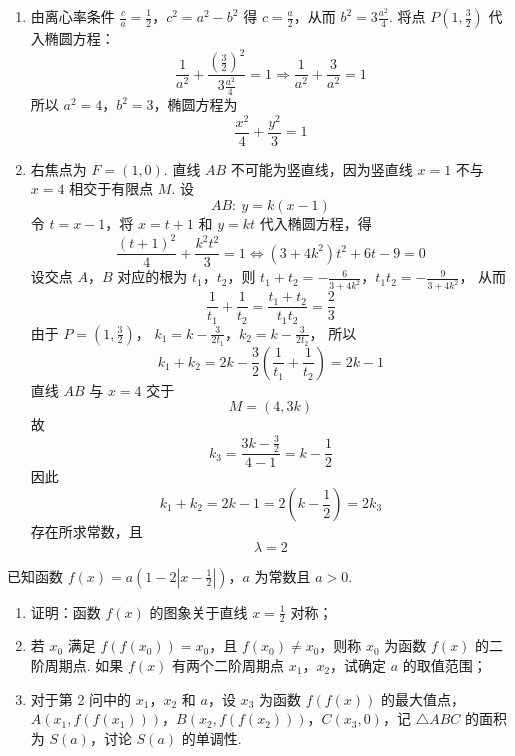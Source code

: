\begin{solution}
\begin{enumerate}
\item 由离心率条件
\(\frac ca=\frac12\)，\(c^2=a^2-b^2\)
得 \(c=\frac{a}{2}\)，从而 \(b^2=3\frac{a^2}{4}\). 将点 \(P(1,\frac{3}{2})\) 代入椭圆方程：
\[
\frac1{a^2}+\frac{(\frac{3}{2})^2}{3\frac{a^2}{4}}=1
\Longrightarrow
\frac1{a^2}+\frac3{a^2}=1
\]
所以 \(a^2=4\)，\(b^2=3\)，椭圆方程为
\[
\frac{x^2}{4}+\frac{y^2}{3}=1
\]

\item 右焦点为 \(F=(1,0)\). 直线 \(AB\) 不可能为竖直线，因为竖直线 \(x=1\) 不与 \(x=4\) 相交于有限点 \(M\). 设
\[
AB:\ y=k(x-1)
\]
令 \(t=x-1\)，将 \(x=t+1\) 和 \(y=kt\) 代入椭圆方程，得
\[
\frac{(t+1)^2}{4}+\frac{k^2t^2}{3}=1
\Longleftrightarrow
(3+4k^2)t^2+6t-9=0
\]
设交点 \(A\)，\(B\) 对应的根为 \(t_1\)，\(t_2\)，则
\(t_1+t_2=-\frac6{3+4k^2}\)，\(t_1t_2=-\frac9{3+4k^2}\)，
从而
\[
\frac1{t_1}+\frac1{t_2}
=\frac{t_1+t_2}{t_1t_2}
=\frac23
\]
由于 \(P=(1,\frac{3}{2})\)，
\(k_1=k-\frac{3}{2t_1}\)，\(k_2=k-\frac{3}{2t_2}\)，
所以
\[
k_1+k_2
=2k-\frac32\left(\frac1{t_1}+\frac1{t_2}\right)
=2k-1
\]
直线 \(AB\) 与 \(x=4\) 交于
\[
M=(4,3k)
\]
故
\[
k_3=\frac{3k-\frac{3}{2}}{4-1}=k-\frac12
\]
因此
\[
k_1+k_2=2k-1=2\left(k-\frac12\right)=2k_3
\]
存在所求常数，且
\[
\lambda=2
\]
\end{enumerate}
\end{solution}

\begin{problem}
已知函数 \(f(x) = a\left(1 - 2\left|x - \frac{1}{2}\right|\right)\)，\(a\) 为常数且 \(a > 0\).

\begin{enumerate}
\item 证明：函数 \(f(x)\) 的图象关于直线 \(x = \frac{1}{2}\) 对称；
\item 若 \(x_0\) 满足 \(f(f(x_0)) = x_0\)，且 \(f(x_0) \neq x_0\)，则称 \(x_0\) 为函数 \(f(x)\) 的二阶周期点. 如果 \(f(x)\) 有两个二阶周期点 \(x_1\)，\(x_2\)，试确定 \(a\) 的取值范围；
\item 对于第 2 问中的 \(x_1\)，\(x_2\) 和 \(a\)，设 \(x_3\) 为函数 \(f(f(x))\) 的最大值点，\(A(x_1, f(f(x_1)))\)，\(B(x_2, f(f(x_2)))\)，\(C(x_3, 0)\)，记 \(\triangle ABC\) 的面积为 \(S(a)\)，讨论 \(S(a)\) 的单调性.
\end{enumerate}
\end{problem}

